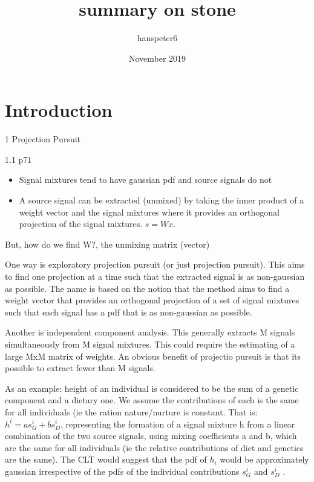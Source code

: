 \documentclass{article}
\title{summary on stone}
\author{hanspeter6 }
\date{November 2019}
\begin{document}
\maketitle

\section{Introduction}

1 Projection Pursuit

1.1 p71

\begin{itemize}
    \item  Signal mixtures tend to have gaussian pdf and source signals do not
    \item A source signal can be extracted (unmixed) by taking the inner product of a weight vector and the signal mixtures where it provides an orthogonal projection of the signal mixtures. $s=Wx$.
\end{itemize}

But, how do we find W?, the unmixing matrix (vector)

One way is exploratory projection pursuit (or just projection pursuit). This aims to find one projection at a time such that the extracted signal is as non-gaussian as possible. The name is based on the notion that the method aims to find a weight vector that provides an orthogonal projection of a set of signal mixtures such that each signal has a pdf that is as non-gaussian as possible.

Another is independent component analysis. This generally extracts M signals simultaneously from M signal mixtures. This could require the estimating of a large MxM matrix of weights. An obvious benefit of projectio pursuit is that its possible to extract fewer than M signals.

As an example: height of an individual is considered to be the sum of a genetic component and a dietary one. We assume the contributions of each is the same for all individuals (ie the ration nature/nurture is constant. That is: $h^{i}=as_{G}^{i}+bs_{D}^{i}$, representing the formation of a signal mixture h from a linear combination of the two source signals, using mixing coefficients a and b, which are the same for all individuals (ie the relative contributions of diet and genetics are the same). The CLT would suggest that the pdf of $h_{i}$ would be approximately gaussian irrespective of the pdfs of the individual contributions $s_{G}^{i}$ and $s_{D}^{i}$ .
\end{document}

